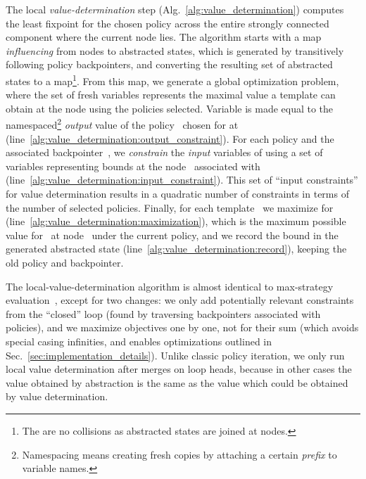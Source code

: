 \documentclass{llncs}
\begin{document}
The local \emph{value-determination} step (Alg.~\ref{alg:value_determination})
computes the least fixpoint for the chosen policy across the entire strongly
connected component where the current node  lies.
The algorithm starts with a map \emph{influencing} from nodes to  abstracted
states, which is generated by transitively following policy backpointers,
and converting the resulting set of abstracted states to a map\footnote{The are no collisions as abstracted
    states are joined at nodes.}.
From this map, we generate a global optimization problem, where the set of
fresh variables  represents the maximal value a template  can obtain
at the node  using the policies selected.
Variable  is made equal to the namespaced\footnote{Namespacing means creating fresh copies by attaching a certain \emph{prefix}
to variable names.} \emph{output} value of the
policy~ chosen for  at 
(line~\ref{alg:value_determination:output_constraint}).
For each policy  and the associated backpointer~, we \emph{constrain}
the \emph{input} variables of  using a set of variables 
representing bounds at the node~ associated with~
(line~\ref{alg:value_determination:input_constraint}).
This set of ``input constraints'' for value determination results in a quadratic
number of constraints in terms of the number of selected policies.
Finally, for each template~ we maximize for~
(line~\ref{alg:value_determination:maximization}),
which is the maximum possible value for~ at node~
under the current policy, and we
record the bound in the generated abstracted state
(line~\ref{alg:value_determination:record}),
keeping the old policy and backpointer.

The local-value-determination algorithm is almost identical to max-strategy
evaluation~\cite{policy_iteration_path_focusing},
except for two changes: we only add potentially relevant constraints from the
``closed'' loop (found by traversing backpointers associated with policies),
and we maximize objectives one by one,
not for their sum (which avoids special casing
infinities, and enables optimizations outlined in
Sec.~\ref{sec:implementation_details}).
Unlike classic policy iteration, we only run local value determination
after merges on loop heads,
because in other cases the value obtained by abstraction is the same as the
value which could be obtained by value determination.
\end{document}
